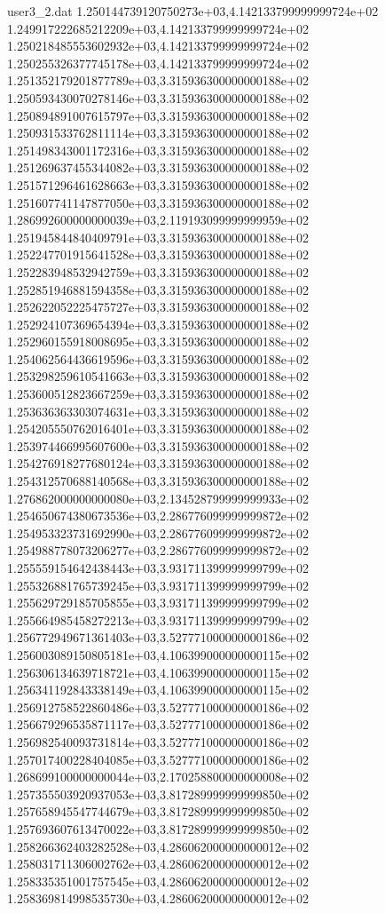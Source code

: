\begin{filecontents}{user3_2.dat}
1.250144739120750273e+03,4.142133799999999724e+02
1.249917222685212209e+03,4.142133799999999724e+02
1.250218485553602932e+03,4.142133799999999724e+02
1.250255326377745178e+03,4.142133799999999724e+02
1.251352179201877789e+03,3.315936300000000188e+02
1.250593430070278146e+03,3.315936300000000188e+02
1.250894891007615797e+03,3.315936300000000188e+02
1.250931533762811114e+03,3.315936300000000188e+02
1.251498343001172316e+03,3.315936300000000188e+02
1.251269637455344082e+03,3.315936300000000188e+02
1.251571296461628663e+03,3.315936300000000188e+02
1.251607741147877050e+03,3.315936300000000188e+02
1.286992600000000039e+03,2.119193099999999959e+02
1.251945844840409791e+03,3.315936300000000188e+02
1.252247701915641528e+03,3.315936300000000188e+02
1.252283948532942759e+03,3.315936300000000188e+02
1.252851946881594358e+03,3.315936300000000188e+02
1.252622052225475727e+03,3.315936300000000188e+02
1.252924107369654394e+03,3.315936300000000188e+02
1.252960155918008695e+03,3.315936300000000188e+02
1.254062564436619596e+03,3.315936300000000188e+02
1.253298259610541663e+03,3.315936300000000188e+02
1.253600512823667259e+03,3.315936300000000188e+02
1.253636363303074631e+03,3.315936300000000188e+02
1.254205550762016401e+03,3.315936300000000188e+02
1.253974466995607600e+03,3.315936300000000188e+02
1.254276918277680124e+03,3.315936300000000188e+02
1.254312570688140568e+03,3.315936300000000188e+02
1.276862000000000080e+03,2.134528799999999933e+02
1.254650674380673536e+03,2.286776099999999872e+02
1.254953323731692990e+03,2.286776099999999872e+02
1.254988778073206277e+03,2.286776099999999872e+02
1.255559154642438443e+03,3.931711399999999799e+02
1.255326881765739245e+03,3.931711399999999799e+02
1.255629729185705855e+03,3.931711399999999799e+02
1.255664985458272213e+03,3.931711399999999799e+02
1.256772949671361403e+03,3.527771000000000186e+02
1.256003089150805181e+03,4.106399000000000115e+02
1.256306134639718721e+03,4.106399000000000115e+02
1.256341192843338149e+03,4.106399000000000115e+02
1.256912758522860486e+03,3.527771000000000186e+02
1.256679296535871117e+03,3.527771000000000186e+02
1.256982540093731814e+03,3.527771000000000186e+02
1.257017400228404085e+03,3.527771000000000186e+02
1.268699100000000044e+03,2.170258800000000008e+02
1.257355503920937053e+03,3.817289999999999850e+02
1.257658945547744679e+03,3.817289999999999850e+02
1.257693607613470022e+03,3.817289999999999850e+02
1.258266362403282528e+03,4.286062000000000012e+02
1.258031711306002762e+03,4.286062000000000012e+02
1.258335351001757545e+03,4.286062000000000012e+02
1.258369814998535730e+03,4.286062000000000012e+02

\end{filecontents}
